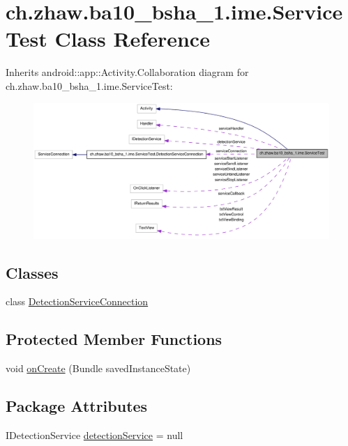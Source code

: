 \hypertarget{classch_1_1zhaw_1_1ba10__bsha__1_1_1ime_1_1ServiceTest}{
\section{ch.zhaw.ba10\_\-bsha\_\-1.ime.ServiceTest Class Reference}
\label{classch_1_1zhaw_1_1ba10__bsha__1_1_1ime_1_1ServiceTest}
}


Inherits android::app::Activity.Collaboration diagram for ch.zhaw.ba10\_\-bsha\_\-1.ime.ServiceTest:\nopagebreak
\begin{figure}[H]
\begin{center}
\leavevmode
\includegraphics[width=400pt]{classch_1_1zhaw_1_1ba10__bsha__1_1_1ime_1_1ServiceTest__coll__graph}
\end{center}
\end{figure}
\subsection*{Classes}
\begin{DoxyCompactItemize}
\item 
class \hyperlink{classch_1_1zhaw_1_1ba10__bsha__1_1_1ime_1_1ServiceTest_1_1DetectionServiceConnection}{DetectionServiceConnection}
\end{DoxyCompactItemize}
\subsection*{Protected Member Functions}
\begin{DoxyCompactItemize}
\item 
void \hyperlink{classch_1_1zhaw_1_1ba10__bsha__1_1_1ime_1_1ServiceTest_a26ed9a2164e8ed852c0755ed175c3805}{onCreate} (Bundle savedInstanceState)
\end{DoxyCompactItemize}
\subsection*{Package Attributes}
\begin{DoxyCompactItemize}
\item 
IDetectionService \hyperlink{classch_1_1zhaw_1_1ba10__bsha__1_1_1ime_1_1ServiceTest_aa8b6876190c4c3bfdba83a05065ee667}{detectionService} = null
\end{DoxyCompactItemize}

